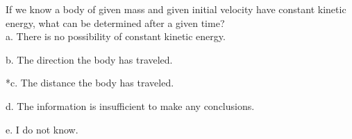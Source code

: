 
If we know a body of given mass and given initial velocity have constant kinetic energy, what can be determined after a given time? \\

a. There is no possibility of constant kinetic energy.

b. The direction the body has traveled.

*c. The distance the body has traveled.

d. The information is insufficient to make any conclusions. 

e. I do not know. \\
